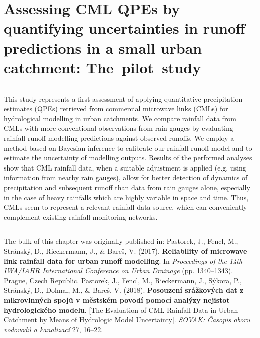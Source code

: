 \documentclass{ctuthesis}\usepackage[]{graphicx}\usepackage[]{color}
\begin{document}
        


\chapter{Assessing CML QPEs by quantifying uncertainties in runoff predictions in a small urban catchment: The~pilot~study} \label{chap4}



\rule{\textwidth}{0.4pt}
This study represents a first assessment of applying quantitative precipitation estimates (QPEs) retrieved from commercial microwave links (CMLs) for hydrological modelling in urban catchments. We compare rainfall data from CMLs with more conventional observations from rain gauges by evaluating rainfall-runoff modelling predictions against observed runoffs. We employ a method based on Bayesian inference to calibrate our rainfall-runoff model and to estimate the uncertainty of modelling outputs. Results of the performed analyses show that CML rainfall data, when a suitable adjustment is applied (e.g. using information from nearby rain gauges), allow for better detection of dynamics of precipitation and subsequent runoff than data from rain gauges alone, especially in the case of heavy rainfalls which are highly variable in space and time. Thus, CMLs seem to represent a relevant rainfall data source, which can conveniently complement existing rainfall monitoring networks.
\rule[0.2cm]{\textwidth}{0.4pt}

{\footnotesize The bulk of this chapter was originally published in: \newline
\-\hspace{0.5cm}
Pastorek, J., Fencl, M., Stránský, D., Rieckermann, J., \& Bareš, V. (2017). \textbf{Reliability
of microwave link rainfall data for urban runoff modelling}. In \emph{Proceedings of the
14th IWA/IAHR International Conference on Urban Drainage} (pp. 1340--1343). Prague, Czech Republic.
\newline \-\hspace{0.5cm}
Pastorek, J., Fencl, M., Rieckermann, J., Sýkora, P., Stránský, D., Dohnal, M., \& Bareš, V. (2018). \textbf{Posouzení srážkových dat z mikrovlnných spojů v městském povodí pomocí analýzy nejistot hydrologického modelu}. [The Evaluation of CML Rainfall Data in Urban Catchment by Means of Hydrologic Model Uncertainty]. \emph{SOVAK: Časopis oboru vodovodů a kanalizací} 27, 16--22.
}
\end{document}
